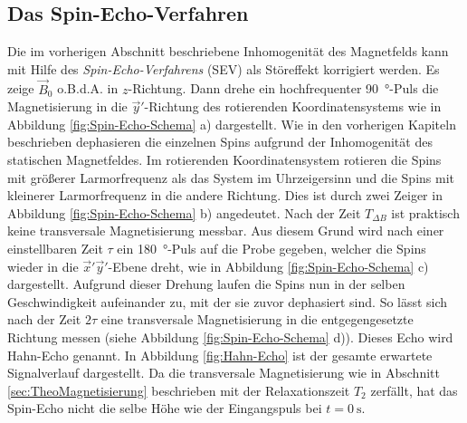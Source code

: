 \subsection{Das Spin-Echo-Verfahren}
\label{sec:Spin-Echo-Verfahren}

Die im vorherigen Abschnitt beschriebene Inhomogenität des Magnetfelds kann
mit Hilfe des \emph{Spin-Echo-Verfahrens} (SEV) als Störeffekt korrigiert werden.
Es zeige $\vec{B}_0$ o.B.d.A. in $z$-Richtung.
Dann drehe ein hochfrequenter \SI{90}{\degree}-Puls die Magnetisierung in
die $\vec{y}'$-Richtung des rotierenden Koordinatensystems
wie in Abbildung \ref{fig:Spin-Echo-Schema} a) dargestellt.
Wie in den vorherigen Kapiteln beschrieben dephasieren die einzelnen Spins
aufgrund der Inhomogenität des statischen Magnetfeldes.
Im rotierenden Koordinatensystem rotieren die Spins mit größerer Larmorfrequenz als
das System im Uhrzeigersinn und die Spins mit kleinerer Larmorfrequenz
in die andere Richtung.
Dies ist durch zwei Zeiger in Abbildung \ref{fig:Spin-Echo-Schema} b) angedeutet.
Nach der Zeit $T_{\Delta B}$ ist praktisch keine transversale Magnetisierung messbar.
Aus diesem Grund wird nach einer einstellbaren Zeit $\tau$ ein
\SI{180}{\degree}-Puls auf die Probe gegeben, welcher die Spins wieder in die
$\vec{x}' \vec{y}'$-Ebene dreht, wie in Abbildung \ref{fig:Spin-Echo-Schema} c) dargestellt.
Aufgrund dieser Drehung laufen die Spins nun in der selben Geschwindigkeit aufeinander
zu, mit der sie zuvor dephasiert sind.
So lässt sich nach der Zeit $2 \tau$ eine transversale Magnetisierung in die
entgegengesetzte Richtung messen (siehe Abbildung \ref{fig:Spin-Echo-Schema} d)).
Dieses Echo wird Hahn-Echo genannt.
In Abbildung \ref{fig:Hahn-Echo} ist der gesamte erwartete Signalverlauf dargestellt.
Da die transversale Magnetisierung wie in Abschnitt \ref{sec:TheoMagnetisierung}
beschrieben mit der Relaxationszeit $T_2$ zerfällt, hat das Spin-Echo nicht die
selbe Höhe wie der Eingangspuls bei $t = \SI{0}{\second}$.
